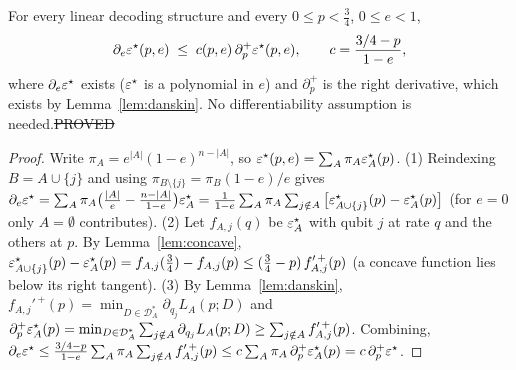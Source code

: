 \begin{theorem}\label{thm:rate-right}
For every linear decoding structure and every $0\le p<\tfrac34$, $0\le e<1$,
\[
\partial_e\varepsilon^{\star}(p,e)\;\le\;c(p,e)\,\partial_p^+\varepsilon^{\star}(p,e),\qquad c=\frac{3/4-p}{1-e},
\]
where $\partial_e\varepsilon^{\star}$ exists ($\varepsilon^{\star}$ is a polynomial in $e$) and $\partial_p^+$ is the right derivative, which exists by Lemma~\ref{lem:danskin}. No differentiability assumption is needed.\hfill\st{PROVED}
\end{theorem}
\begin{proof}
Write $\pi_A=e^{|A|}(1-e)^{n-|A|}$, so $\varepsilon^{\star}(p,e)=\sum_A\pi_A\varepsilon^{\star}_A(p)$.
(1) Reindexing $B=A\cup\{j\}$ and using $\pi_{B\setminus\{j\}}=\pi_B(1-e)/e$ gives
$\partial_e\varepsilon^{\star}=\sum_A\pi_A\big(\tfrac{|A|}e-\tfrac{n-|A|}{1-e}\big)\varepsilon^{\star}_A=\tfrac1{1-e}\sum_A\pi_A\sum_{j\notin A}\big[\varepsilon^{\star}_{A\cup\{j\}}(p)-\varepsilon^{\star}_A(p)\big]$ (for $e=0$ only $A=\emptyset$ contributes).
(2) Let $f_{A,j}(q)$ be $\varepsilon^{\star}_A$ with qubit $j$ at rate $q$ and the others at $p$. By Lemma~\ref{lem:concave}, $\varepsilon^{\star}_{A\cup\{j\}}(p)-\varepsilon^{\star}_A(p)=f_{A,j}(\tfrac34)-f_{A,j}(p)\le(\tfrac34-p)\,f_{A,j}'^{\,+}(p)$ (a concave function lies below its right tangent).
(3) By Lemma~\ref{lem:danskin}, $f_{A,j}'^{\,+}(p)=\min_{D\in\mathcal D^\ast_A}\partial_{q_j}L_A(p;D)$ and $\partial_p^+\varepsilon^{\star}_A(p)=\min_{D\in\mathcal D^\ast_A}\sum_{j\notin A}\partial_{q_j}L_A(p;D)\ge\sum_{j\notin A}f_{A,j}'^{\,+}(p)$.
Combining, $\partial_e\varepsilon^{\star}\le\tfrac{3/4-p}{1-e}\sum_A\pi_A\sum_{j\notin A}f_{A,j}'^{\,+}(p)\le c\sum_A\pi_A\,\partial_p^+\varepsilon^{\star}_A(p)=c\,\partial_p^+\varepsilon^{\star}$.
\end{proof}

